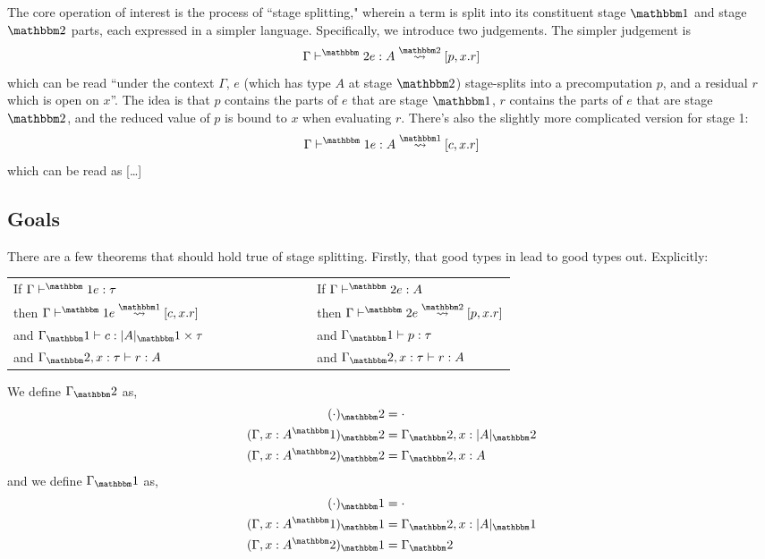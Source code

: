 \documentclass[11pt]{article}
\newcommand {\bbone} {\mathbbm 1}
\newcommand {\bbtwo} {\mathbbm 2}
\newcommand {\gdo} {{\Gamma \vdash^\bbone}}
\newcommand {\gdt} {{\Gamma \vdash^\bbtwo}}
\newcommand {\splito} {\overset{\bbone}\rightsquigarrow}
\newcommand {\splits} {\overset{\bbtwo}\rightsquigarrow}
\begin{document}
The core operation of interest is the process of ``stage splitting," wherein a term is split into its constituent stage $\bbone$ and stage $\bbtwo$ parts, each expressed in a simpler language.  Specifically, we introduce two judgements.  The simpler judgement is 
\[\gdt e : A \splits [p,x.r]\] 
which can be read ``under the context $\Gamma$, $e$ (which has type $A$ at stage $\bbtwo$) stage-splits into a precomputation $p$, and a residual $r$ which is open on $x$''.  The idea is that $p$ contains the parts of $e$ that are stage $\bbone$, $r$ contains the parts of $e$ that are stage $\bbtwo$, and the reduced value of $p$ is bound to $x$ when evaluating $r$.  There's also the slightly more complicated version for stage 1:
\[\gdo e : A \splito [c,x.r]\]
which can be read as [\ldots]

\subsection {Goals}

There are a few theorems that should hold true of stage splitting.  Firstly, that good types in lead to good types out.  Explicitly:

\begin{center}
\begin{tabular}{lll}
If $\gdo e:\tau $ &~~~~~~~~~~~~~~ & If $\gdt e:A$ \\
then $\gdo e \splito  [c,x.r]$ && then $\gdt e \splits [p,x.r]$ \\
and $\Gamma_\bbone \vdash c:|A|_\bbone\times\tau$ && and $\Gamma_\bbone \vdash p:\tau$\\
and $\Gamma_\bbtwo, x:\tau \vdash r:A$ && and $\Gamma_\bbtwo, x:\tau \vdash r:A$
\end{tabular}
\end{center}
We define $\Gamma_\bbtwo$ as,
\begin{align}
(\cdot)_\bbtwo &= \cdot \\ 
(\Gamma,x:A^\bbone)_\bbtwo &= \Gamma_\bbtwo, x:|A|_\bbtwo\\
(\Gamma,x:A^\bbtwo)_\bbtwo &= \Gamma_\bbtwo, x:A
\end{align}
and we define $\Gamma_\bbone$ as,
\begin{align}
(\cdot)_\bbone &= \cdot \\ 
(\Gamma,x:A^\bbone)_\bbone &= \Gamma_\bbtwo, x:|A|_\bbone \\
(\Gamma,x:A^\bbtwo)_\bbone &= \Gamma_\bbtwo
\end{align}
\end{document}
